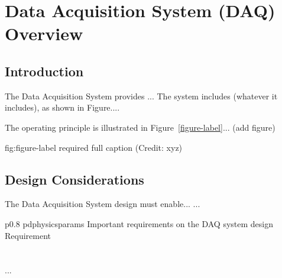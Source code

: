 \section{Data Acquisition System (DAQ) Overview}
\label{sec:fdsp-daq-ov}


\subsection{Introduction}
\label{sec:fdsp-daq-intro}

The Data Acquisition System provides ...
The system includes (whatever it includes), as shown in Figure.... 


The operating principle is illustrated in Figure~\ref{figure-label}... (add figure)

\begin{dunefigure}{fig:figure-label}
{required full caption (Credit: xyz)}
\end{dunefigure}

\subsection{Design Considerations}
\label{sec:fdsp-daq-des-consid}




The Data Acquisition System design must enable... 
...


\begin{dunetable}
{p{0.8\textwidth}}
{pdphysicsparams}
{Important requirements on the DAQ system design}   
Requirement  \\ \toprowrule
  \\ \colhline
   \\ \colhline
 ...\\ 
\end{dunetable}

